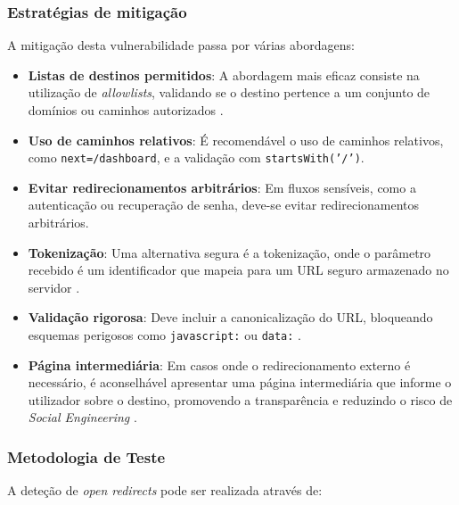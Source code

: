\subsubsection{Estratégias de mitigação}
\label{subsubsec:estrategias-mitigacao-open-redirects}

A mitigação desta vulnerabilidade passa por várias abordagens:

\begin{itemize}
    \item \textbf{Listas de destinos permitidos}: A abordagem mais eficaz consiste na utilização de \textit{allowlists}, validando se o destino pertence a um conjunto de domínios ou caminhos autorizados \cite{ref36}.
    
    \item \textbf{Uso de caminhos relativos}: É recomendável o uso de caminhos relativos, como \texttt{next=/dashboard}, e a validação com \texttt{startsWith('/')}.
    
    \item \textbf{Evitar redirecionamentos arbitrários}: Em fluxos sensíveis, como a autenticação ou recuperação de senha, deve-se evitar redirecionamentos arbitrários.
    
    \item \textbf{Tokenização}: Uma alternativa segura é a tokenização, onde o parâmetro recebido é um identificador que mapeia para um URL seguro armazenado no servidor \cite{ref34}.
    
    \item \textbf{Validação rigorosa}: Deve incluir a canonicalização do URL, bloqueando esquemas perigosos como \texttt{javascript:} ou \texttt{data:} \cite{ref36}.
    
    \item \textbf{Página intermediária}: Em casos onde o redirecionamento externo é necessário, é aconselhável apresentar uma página intermediária que informe o utilizador sobre o destino, promovendo a transparência e reduzindo o risco de \textit{Social Engineering} \cite{ref35}.
\end{itemize}

\subsubsection{Metodologia de Teste}
\label{subsubsec:metodologia-teste-open-redirects}

A deteção de \textit{open redirects} pode ser realizada através de:

